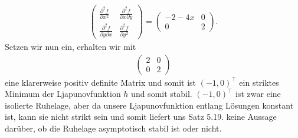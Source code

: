 \begin{solution}
\begin{itemize}
\begin{align*}
\begin{pmatrix}
        \frac{\partial^2 f }{\partial x^2} & \frac{\partial^2 f }{\partial x \partial y} \\
        \frac{\partial^2 f }{\partial y \partial x} & \frac{\partial^2 f }{\partial y^2}
      \end{pmatrix}
      =
      \begin{pmatrix}
        -2-4x & 0 \\
        0 & 2
      \end{pmatrix}.
    \end{align*}
    Setzen wir nun ein, erhalten wir mit
    \begin{align*}
    \begin{pmatrix}
      2 & 0 \\
      0 & 2
    \end{pmatrix}
    \end{align*}
    eine klarerweise positiv definite Matrix und somit ist $(-1,0)^{\top}$
    ein striktes Minimum der Ljapunovfunktion $h$ und somit stabil.
    $(-1,0)^{\top}$ ist zwar eine isolierte Ruhelage, aber da unsere
    Ljapunovfunktion entlang Lösungen konstant ist, kann sie nicht strikt
    sein und somit liefert uns Satz 5.19. keine Aussage darüber, ob die
    Ruhelage asymptotisch stabil ist oder nicht.
  \end{itemize}
\end{solution}
